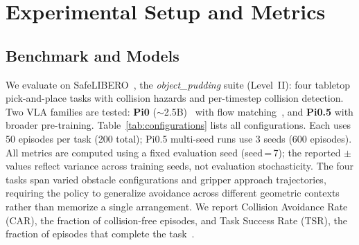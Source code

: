 \section{Experimental Setup and Metrics}\label{sec:method}

\subsection{Benchmark and Models}\label{sec:benchmark}

We evaluate on SafeLIBERO~\cite{hu2025vlsa}, the \textit{object\_pudding} suite (Level~II): four tabletop pick-and-place tasks with collision hazards and per-timestep collision detection. Two VLA families are tested: \textbf{Pi0} (${\sim}$2.5B)~\cite{black2024pi0} with flow matching~\cite{lipman2023flow}, and \textbf{Pi0.5} with broader pre-training. Table~\ref{tab:configurations} lists all configurations. Each uses 50 episodes per task (200 total); Pi0.5 multi-seed runs use 3 seeds (600 episodes). All metrics are computed using a fixed evaluation seed (seed\,=\,7); the reported $\pm$ values reflect variance across training seeds, not evaluation stochasticity. The four tasks span varied obstacle configurations and gripper approach trajectories, requiring the policy to generalize avoidance across different geometric contexts rather than memorize a single arrangement. We report Collision Avoidance Rate (CAR), the fraction of collision-free episodes, and Task Success Rate (TSR), the fraction of episodes that complete the task~\cite{hu2025vlsa,zhang2025safevla}.

\begin{table}[t]
\centering
\caption{Training configurations. Trainable parameters exclude the frozen backbone. Pi0+A1 LoRA weights were not loaded due to a parameter-name mismatch; only auxiliary heads were trained.}
\label{tab:configurations}
\vspace{2pt}
\footnotesize
{}
\end{table}

